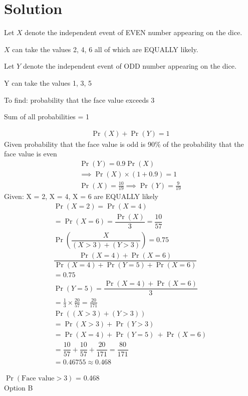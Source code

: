 \documentclass[journal,12pt,twocolumn]{IEEEtran}
\providecommand{\pr}[1]{\ensuremath{\Pr\left(#1\right)}}
\theoremstyle{remark}
\numberwithin{equation}{subsection}
\begin{document}
\section{\Large Solution}
\onehalfspacing
\begin{description}
\item Let $X$ denote the independent event of EVEN number appearing on the dice.
\item $X$ can take the values 2, 4, 6 all of which are EQUALLY likely.
\item Let $Y$ denote the independent event of ODD number appearing on the dice. 
\item Y can take the values 1, 3, 5
\item To find: probability that the face value exceeds 3
\item Sum of all probabilities = 1
\end{description}
\begin{align}
    \pr{X} + \pr{Y} = 1
\end{align}
Given probability that the face value is odd is 90\% of the probability that the face value is even
\begin{align}
    \pr{Y} = 0.9\pr{X}\\
    \implies \pr{X}\times (1 + 0.9) = 1\\
    \pr{X} = \frac{10}{19} \implies \pr{Y} = \frac{9}{19}
\end{align}
Given: X = 2, X = 4, X = 6 are EQUALLY likely
\begin{align}
    \pr{X = 2} = \pr{X = 4}\\
    = \pr{X = 6} = \dfrac{\pr{X}}{3} = \dfrac{10}{57}\\
    \pr{\dfrac{X}{(X > 3) + (Y > 3)}} = 0.75\\
    \dfrac{\pr{X = 4} + \pr{X = 6}}{\pr{X = 4} + \pr{Y = 5} + \pr{X = 6}}\\
    = 0.75\\
    \pr{Y = 5} = \dfrac {\pr{X = 4} + \pr{X = 6}}{3}\\
    = \frac{1}{3}\times\frac{20}{57} = \frac{20}{171}\\
    \pr{(X > 3) + (Y > 3)}\\
    = \pr{X > 3} + \pr{Y > 3}\\
    = \pr{X = 4} + \pr{Y = 5}\ + \pr{X = 6}\\
    = \dfrac{10}{57} + \dfrac{10}{57} + \dfrac{20}{171} = \dfrac{80}{171}\\
    = 0.46755 \approx 0.468
\end{align}

\centering
\Large $\pr{\text{Face value} > 3}$ = 0.468\\[5pt]
Option B
\end{document}
